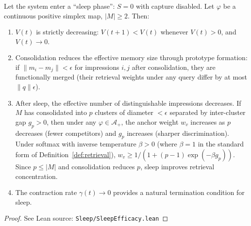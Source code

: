 \begin{theorem}
\label{thm:sleep_efficacy}
\leanok
{}
Let the system enter a ``sleep phase'': $S = 0$ with capture disabled.  Let $\varphi$ be a continuous positive simplex map, $|M| \geq 2$.  Then:
\begin{enumerate}
\item $V(t)$ is strictly decreasing: $V(t+1) < V(t)$ whenever $V(t) > 0$, and $V(t) \to 0$.
\item Consolidation reduces the effective memory size through prototype formation: if $\|m_i - m_j\| < \epsilon$ for impressions $i, j$ after consolidation, they are functionally merged (their retrieval weights under any query differ by at most $\|q\|\epsilon$).
\item After sleep, the effective number of distinguishable impressions decreases.  If $M$ has consolidated into $p$ clusters of diameter $< \epsilon$ separated by inter-cluster gap $g_p > 0$, then under any $\varphi \in \mathcal{A}_+$, the anchor weight $w_v$ increases as $p$ decreases (fewer competitors) and $g_p$ increases (sharper discrimination).  Under softmax with inverse temperature $\beta > 0$ (where $\beta = 1$ in the standard form of Definition~\ref{def:retrieval}), $w_v \geq 1/(1 + (p-1)\exp(-\beta g_p))$.  Since $p \leq |M|$ and consolidation reduces $p$, sleep improves retrieval concentration.
\item The contraction rate $\gamma(t) \to 0$ provides a natural termination condition for sleep.
\end{enumerate}
\end{theorem}

\begin{proof}
\leanok
{}
See Lean source: \texttt{Sleep/SleepEfficacy.lean}
\end{proof}

